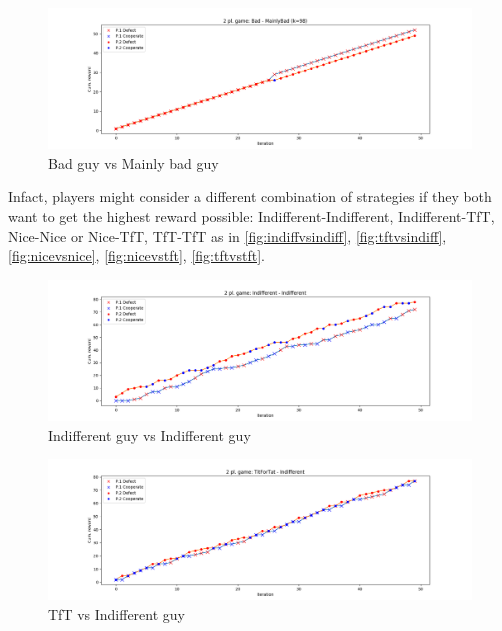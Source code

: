 \documentclass[journal,a4paper,10pt,twoside]{IEEEtran}
\begin{document}
\begin{figure}
    \centering
    \includegraphics[width=1\columnwidth]{../img_v1/idp2p-rewards-Bad-MainlyBad (k=98).png}
    \caption{Bad guy vs Mainly bad guy}
    \label{fig:badvsmainlybad}
\end{figure}

Infact, players might consider a different combination of strategies if they both want to get the highest reward possible: Indifferent-Indifferent, Indifferent-TfT, Nice-Nice or Nice-TfT, TfT-TfT as in \autoref{fig:indiffvsindiff}, \autoref{fig:tftvsindiff}, \autoref{fig:nicevsnice}, \autoref{fig:nicevstft}, \autoref{fig:tftvstft}.

\begin{figure}
    \centering
    \includegraphics[width=1\columnwidth]{../img_v1/idp2p-rewards-Indifferent-Indifferent.png}
    \caption{Indifferent guy vs Indifferent guy}
    \label{fig:indiffvsindiff}
\end{figure}

\begin{figure}
    \centering
    \includegraphics[width=1\columnwidth]{../img_v1/idp2p-rewards-TitForTat-Indifferent.png}
    \caption{TfT vs Indifferent guy}
    \label{fig:tftvsindiff}
\end{figure}
\end{document}
